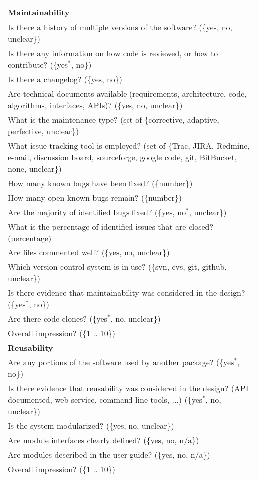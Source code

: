 \begin{longtable}{p{16cm}}
  \midrule
  \textbf{Maintainability}\\
  \midrule

  Is there a history of multiple versions of the software? (\{yes, no, unclear\})\\
  Is there any information on how code is reviewed, or how to contribute?
  (\{yes$^*$, no\})\\
  Is there a changelog?  (\{yes, no\})\\
  Are technical documents available (requirements, architecture, code, algorithms, interfaces, APIs)? (\{yes, no, unclear\})\\ 
  What is the maintenance type? (set of \{corrective, adaptive, perfective, unclear\})\\
  What issue tracking tool is employed? (set of \{Trac, JIRA, Redmine, e-mail, discussion board, sourceforge, google code, git, BitBucket, none, unclear\})\\
  How many known bugs have been fixed? (\{number\})\\
  How many open known bugs remain? (\{number\})\\
  Are the majority of identified bugs fixed? (\{yes, no$^*$, unclear\})\\
  What is the percentage of identified issues that are closed? (percentage)\\
  Are files commented well? (\{yes, no, unclear\})\\
  Which version control system is in use? (\{svn, cvs, git, github, unclear\})\\
  Is there evidence that maintainability was considered in the design?
  (\{yes$^*$, no\})\\
  Are there code clones? (\{yes$^*$, no, unclear\})\\
  Overall impression? (\{1 .. 10\})\\

  \midrule
  \textbf{Reusability}\\
  \midrule

  Are any portions of the software used by another package? (\{yes$^*$, no\})\\
  Is there evidence that reusability was considered in the design? (API documented, web service, command line tools, ...) (\{yes$^*$, no, unclear\})\\
  Is the system modularized? (\{yes, no, unclear\})\\
  Are module interfaces clearly defined? (\{yes, no, n/a\})\\
  Are modules described in the user guide? (\{yes, no, n/a\})\\
  Overall impression? (\{1 .. 10\})\\


\end{longtable}
